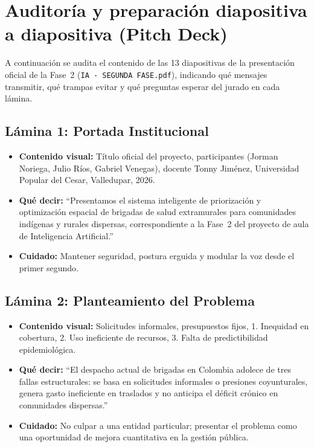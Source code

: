 \documentclass[11pt,a4paper]{article}
\newcommand{\code}[1]{\texttt{#1}}
\begin{document}
\section{Auditoría y preparación diapositiva a diapositiva (Pitch Deck)}

A continuación se audita el contenido de las 13 diapositivas de la presentación oficial de la Fase~2 (\code{IA - SEGUNDA FASE.pdf}), indicando qué mensajes transmitir, qué trampas evitar y qué preguntas esperar del jurado en cada lámina.

\subsection{Lámina 1: Portada Institucional}
\begin{itemize}[leftmargin=*]
  \item \textbf{Contenido visual:} Título oficial del proyecto, participantes (Jorman Noriega, Julio Ríos, Gabriel Venegas), docente Tonny Jiménez, Universidad Popular del Cesar, Valledupar, 2026.
  \item \textbf{Qué decir:} ``Presentamos el sistema inteligente de priorización y optimización espacial de brigadas de salud extramurales para comunidades indígenas y rurales dispersas, correspondiente a la Fase~2 del proyecto de aula de Inteligencia Artificial.''
  \item \textbf{Cuidado:} Mantener seguridad, postura erguida y modular la voz desde el primer segundo.
\end{itemize}

\subsection{Lámina 2: Planteamiento del Problema}
\begin{itemize}[leftmargin=*]
  \item \textbf{Contenido visual:} Solicitudes informales, presupuestos fijos, 1. Inequidad en cobertura, 2. Uso ineficiente de recursos, 3. Falta de predictibilidad epidemiológica.
  \item \textbf{Qué decir:} ``El despacho actual de brigadas en Colombia adolece de tres fallas estructurales: se basa en solicitudes informales o presiones coyunturales, genera gasto ineficiente en traslados y no anticipa el déficit crónico en comunidades dispersas.''
  \item \textbf{Cuidado:} No culpar a una entidad particular; presentar el problema como una oportunidad de mejora cuantitativa en la gestión pública.
\end{itemize}
\end{document}
